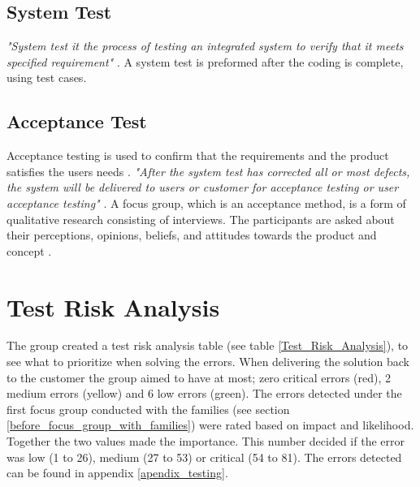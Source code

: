 \subsection{System Test}
\textit{"System test it the process of testing an integrated system to verify that it meets specified requirement"} \cite{systemTest}. A system test is preformed after the coding is complete, using test cases. 

\subsection{Acceptance Test}
Acceptance testing is used to confirm that the requirements and the product satisfies the users needs \cite{acceptanceTesting}. \textit{"After the system test has corrected all or most defects, the system will be delivered to users or customer for acceptance testing or user acceptance testing"} \cite{acceptanceTestingDefinition}. A focus group, which is an acceptance method, is a form of qualitative research consisting of interviews. The participants are asked about their perceptions, opinions, beliefs, and attitudes towards the product and concept \cite{focusGroup}.


\section{Test Risk Analysis}
The group created a test risk analysis table (see table \ref{Test_Risk_Analysis}), to see what to prioritize when solving the errors. When delivering the solution back to the customer the group aimed to have at most; zero critical errors (red), 2 medium errors (yellow) and 6 low errors (green). The errors detected under the first focus group conducted with the families (see section \ref{before_focus_group_with_families}) were rated based on impact and likelihood. Together the two values made the importance. This number decided if the error was low (1 to 26), medium (27 to 53) or critical (54 to 81). The errors detected can be found in appendix \ref{apendix_testing}.


